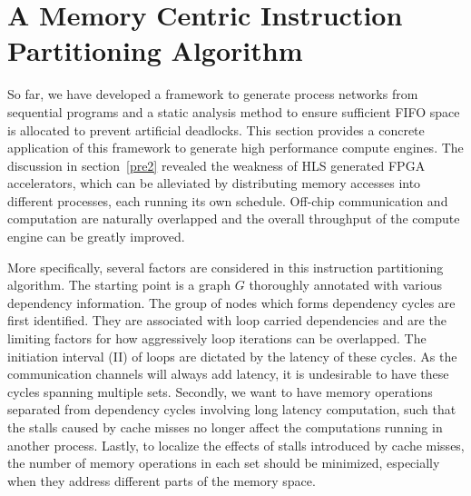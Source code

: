 \documentclass{sig-alternate}
\begin{document}
\section{A Memory Centric Instruction Partitioning Algorithm}
\label{exampleAlgo}
So far, we have developed a framework to generate process networks from  sequential programs and a static analysis method to ensure sufficient FIFO space is allocated to prevent artificial deadlocks. This section provides a concrete application of this
framework to generate high performance compute engines. The discussion in section~\ref{pre2} revealed the weakness of HLS generated FPGA accelerators, which
can be
alleviated by distributing memory accesses into different processes, each running its own schedule. Off-chip communication
and computation are naturally overlapped and the overall throughput of the compute
engine can be greatly improved.

More specifically, several factors are considered in this instruction partitioning algorithm. The starting point is a graph $G$ thoroughly annotated with various dependency information. The group of nodes which forms dependency cycles are first identified. They are associated with loop carried dependencies and are the limiting factors for how aggressively loop iterations can be overlapped. The initiation
interval (II) of loops are dictated by the latency of these cycles.
As the communication channels will always add latency, it is undesirable to have
these cycles spanning multiple sets.
Secondly, we want to have memory operations separated from dependency cycles involving long latency computation, such that the stalls caused by cache misses no longer affect the computations running in another process. Lastly, to
localize the effects of stalls introduced by cache misses, the
number of memory operations in each set should be
minimized, especially when they address different parts of the
memory space.
\end{document}
